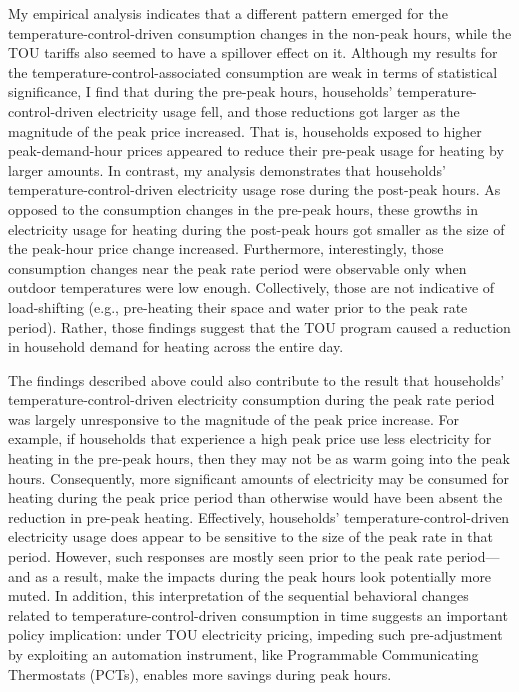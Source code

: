 My empirical analysis indicates that a different pattern emerged for the temperature-control-driven consumption changes in the non-peak hours, while the TOU tariffs also seemed to have a spillover effect on it. Although my results for the temperature-control-associated consumption are weak in terms of statistical significance, I find that during the pre-peak hours, households' temperature-control-driven electricity usage fell, and those reductions got larger as the magnitude of the peak price increased. That is, households exposed to higher peak-demand-hour prices appeared to reduce their pre-peak usage for heating by larger amounts. In contrast, my analysis demonstrates that households' temperature-control-driven electricity usage rose during the post-peak hours. As opposed to the consumption changes in the pre-peak hours, these growths in electricity usage for heating during the post-peak hours got smaller as the size of the peak-hour price change increased. Furthermore, interestingly, those consumption changes near the peak rate period were observable only when outdoor temperatures were low enough. Collectively, those are not indicative of load-shifting (e.g., pre-heating their space and water prior to the peak rate period). Rather, those findings suggest that the TOU program caused a reduction in household demand for heating across the entire day. 

The findings described above could also contribute to the result that households' temperature-control-driven electricity consumption during the peak rate period was largely unresponsive to the magnitude of the peak price increase. For example, if households that experience a high peak price use less electricity for heating in the pre-peak hours, then they may not be as warm going into the peak hours. Consequently, more significant amounts of electricity may be consumed for heating during the peak price period than otherwise would have been absent the reduction in pre-peak heating. Effectively, households' temperature-control-driven electricity usage does appear to be sensitive to the size of the peak rate in that period. However, such responses are mostly seen prior to the peak rate period---and as a result, make the impacts during the peak hours look potentially more muted. In addition, this interpretation of the sequential behavioral changes related to temperature-control-driven consumption in time suggests an important policy implication: under TOU electricity pricing, impeding such pre-adjustment by exploiting an automation instrument, like Programmable Communicating Thermostats (PCTs), enables more savings during peak hours.

